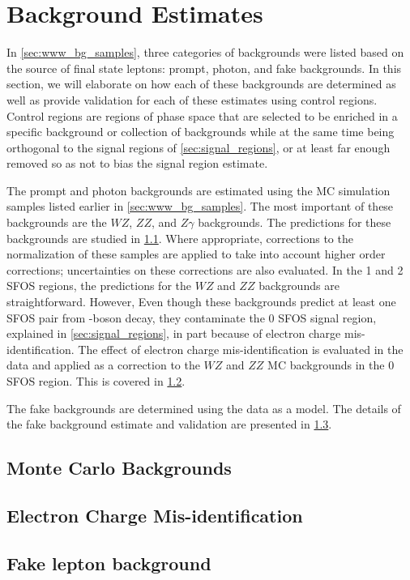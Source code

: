 \section{Background Estimates}
\label{sec:bg_estimates}

In \sec\ref{sec:www_bg_samples}, three categories of backgrounds
were listed based on the source
of final state leptons: prompt, photon, and fake
backgrounds. In this section, we will elaborate on how
each of these backgrounds are determined as well
as provide validation for each of these estimates using
control regions. Control regions are regions of phase space
that are selected to be enriched in a specific background
or collection of backgrounds while at the same time being
orthogonal to the signal regions of \sec\ref{sec:signal_regions},
or at least far enough removed so as not to bias the signal region
estimate.

The prompt and photon backgrounds are estimated using 
the MC simulation samples listed earlier in \sec\ref{sec:www_bg_samples}.
The most important of these backgrounds are the $WZ$, $ZZ$, 
and $Z\gamma$ backgrounds. The predictions for these backgrounds
are studied in \sec\ref{sec:mcbg}. Where appropriate, corrections
to the normalization
of these samples are applied to take into account higher order 
corrections; uncertainties on these corrections are also evaluated.
In the 1 and 2 SFOS regions, the predictions for the $WZ$ and $ZZ$
backgrounds are straightforward. 
However, Even though these backgrounds predict
at least one SFOS pair from \z-boson decay,
they contaminate the 0 SFOS signal region,
explained in \sec\ref{sec:signal_regions}, in part because
of electron charge mis-identification.  The effect of 
electron charge mis-identification is evaluated in the data
and applied as a correction to the $WZ$ and $ZZ$ MC backgrounds
in the 0 SFOS region. This is covered in \sec\ref{sec:charge_misid}.

The fake backgrounds are determined 
using the data as a model. The details of the fake background
estimate and validation are presented in \sec\ref{sec:bg_fake}.





\subsection{Monte Carlo Backgrounds}
\label{sec:mcbg}

\subsection{Electron Charge Mis-identification}
\label{sec:charge_misid}
  
\subsection{Fake lepton background}
\label{sec:bg_fake}

